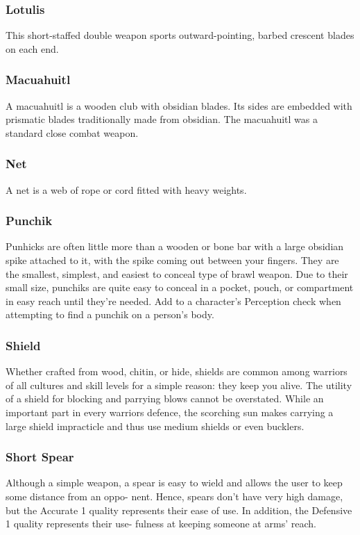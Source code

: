 \begin{multicols}{2}
\subsubsection{Lotulis}
\label{itmmlee:lotulis}
This short-staffed double weapon sports outward-pointing,
barbed crescent blades on each end.

\subsubsection{Macuahuitl}
\label{itmmlee:macuahuitl}
A macuahuitl is a wooden club with obsidian blades. Its sides
are embedded with prismatic blades traditionally made from
obsidian. The macuahuitl was a standard close combat weapon.

\subsubsection{Net}
\label{itmmlee:net}
A net is a web of rope or cord fitted with heavy weights.

\subsubsection{Punchik}
\label{itmmlee:punchik}
Punhicks are often little more than a wooden or bone
bar with a large obsidian spike attached to it, with the spike
coming out between your fingers. They are the smallest, simplest,
and easiest to conceal type of brawl weapon. Due to their
small size, punchiks are quite easy to conceal in a pocket,
pouch, or compartment in easy reach until they're needed. Add
\setback to a character's Perception check when attempting to
find a punchik on a person's body.

\subsubsection{Shield}
\label{itmmlee:shield}
Whether crafted from wood, chitin, or hide, shields are
common among warriors of all cultures and skill levels for
a simple reason: they keep you alive. The utility of a shield
for blocking and parrying blows cannot be overstated. While
an important part in every warriors defence, the scorching sun
makes carrying a large shield impracticle and thus use medium
shields or even bucklers.

\subsubsection{Short Spear}
\label{itmmlee:shortspear}
Although a simple weapon, a spear is easy to wield and
allows the user to keep some distance from an oppo-
nent. Hence, spears don’t have very high damage, but
the Accurate 1 quality represents their ease of use. In
addition, the Defensive 1 quality represents their use-
fulness at keeping someone at arms’ reach.


\end{multicols}
